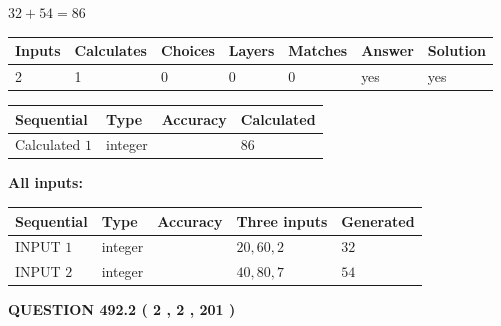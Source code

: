 \documentclass[12pt]{article}
\begin{document}
 

$ %
32 +  %
54=   %
86$
 
 
\noindent{}
 
 

 
   
   
   
   
\noindent\begin{tabular}{|l|l|l|l|l|l|l|}
 \hline
Inputs & Calculates & Choices & Layers & Matches & Answer & Solution \\ \hline
 2  & 
 1  & 
 0
  & 
 0  & 
 0  & 
  yes & 
  yes 
  \\ \hline
 \end{tabular}
   
   
   
   
\noindent{}
   
   
  
  
\noindent\begin{tabular}{|l|l|l|l|}
\hline
 Sequential & Type & Accuracy & Calculated \\ 
\hline
 
 
  Calculated $  1 $ & integer &  & 
  $ 86 $ 
 \\  \hline  
 \end{tabular}
   
   
   
   
\noindent\vspace{0.1in}\hspace{-0.08in} {\textbf{\Large{All inputs: }}}
   
   
  
  
\noindent\begin{tabular}{|l|l|l|l|l|}
\hline
 Sequential & Type & Accuracy & Three inputs & Generated \\ 
\hline
 
 
  INPUT $  1 $ & integer &  & $
 20
 , 
 60
 , 
 2
 $ & $ 32 $ 
 \\  \hline  
 
 
  INPUT $  2 $ & integer &  & $
 40
 , 
 80
 , 
 7
 $ & $ 54 $ 
 \\  \hline  
 \end{tabular}
   
   
  
\vspace{0.2in}
  
{\textbf{\Large{QUESTION
492.2 
 ( 2 , 2 , 201 )
}}}
  
\end{document}
